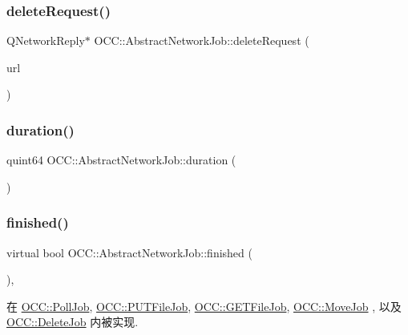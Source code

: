 \subsubsection{\texorpdfstring{delete\+Request()}{deleteRequest()}}
{\footnotesize\ttfamily Q\+Network\+Reply$\ast$ O\+C\+C\+::\+Abstract\+Network\+Job\+::delete\+Request (\begin{DoxyParamCaption}\item[{const Q\+Url \&}]{url }\end{DoxyParamCaption})\hspace{0.3cm}{\ttfamily [protected]}}

\mbox{\label{class_o_c_c_1_1_abstract_network_job_a100683873781f0a715e4b34ab7cc8d16}} 
\subsubsection{\texorpdfstring{duration()}{duration()}}
{\footnotesize\ttfamily quint64 O\+C\+C\+::\+Abstract\+Network\+Job\+::duration (\begin{DoxyParamCaption}{ }\end{DoxyParamCaption})}

\mbox{\label{class_o_c_c_1_1_abstract_network_job_af811f7299d7e526678a8758f2e7102d2}} 
\subsubsection{\texorpdfstring{finished()}{finished()}}
{\footnotesize\ttfamily virtual bool O\+C\+C\+::\+Abstract\+Network\+Job\+::finished (\begin{DoxyParamCaption}{ }\end{DoxyParamCaption})\hspace{0.3cm}{\ttfamily [protected]}, {}}



在 \hyperlink{class_o_c_c_1_1_poll_job_a06b39d3adf1ff0cccadfc3ca74be81d0}{O\+C\+C\+::\+Poll\+Job}, \hyperlink{class_o_c_c_1_1_p_u_t_file_job_aeca049817cfb255d038f4bc7faf0a204}{O\+C\+C\+::\+P\+U\+T\+File\+Job}, \hyperlink{class_o_c_c_1_1_g_e_t_file_job_a41e95ff131e8009d6cd8c2d063eeb7c0}{O\+C\+C\+::\+G\+E\+T\+File\+Job}, \hyperlink{class_o_c_c_1_1_move_job_a2cea82684a6f32d91245b8e974f516dd}{O\+C\+C\+::\+Move\+Job} , 以及 \hyperlink{class_o_c_c_1_1_delete_job_a5776804580c1eee33e5bf72a614a49f1}{O\+C\+C\+::\+Delete\+Job} 内被实现.

